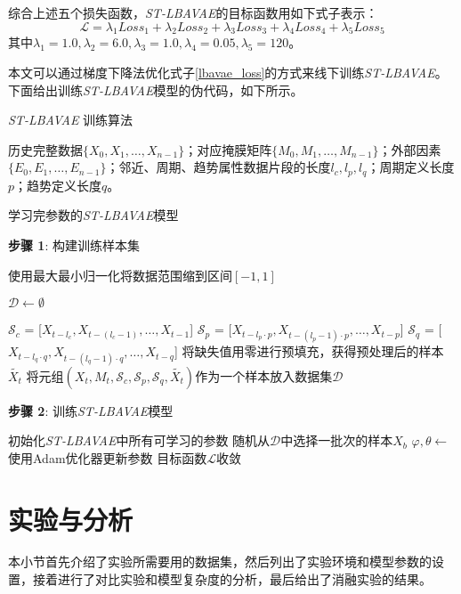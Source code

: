 综合上述五个损失函数，\textit{ST-LBAVAE}的目标函数用如下式子表示：
\begin{equation}
	\mathcal{L} = \lambda_1 Loss_1 + \lambda_2 Loss_2 + \lambda_3 Loss_3 + \lambda_4 Loss_4 + \lambda_5 Loss_5 \label{lbavae_loss}
\end{equation}
其中$\lambda_1=1.0, \lambda_2=6.0, \lambda_3=1.0, \lambda_4=0.05, \lambda_5=120$。
 
本文可以通过梯度下降法优化式子\eqref{lbavae_loss}的方式来线下训练\textit{ST-LBAVAE}。下面给出训练\textit{ST-LBAVAE}模型的伪代码，如下所示。
\begin{algorithm}[htbp]
	\renewcommand{\algorithmicrequire}{\textbf{输入:}}
	\renewcommand{\algorithmicensure}{\textbf{输出:}}
	\caption{\quad \textit{ST-LBAVAE} 训练算法}
	\label{alg1}
	\begin{algorithmic}[1]
		\REQUIRE 历史完整数据$\{X_0, X_1, \dots,X_{n-1}  \}$；对应掩膜矩阵$\{M_0, M_1, \dots,M_{n-1}  \}$；外部因素$\{E_0, E_1, \dots,E_{n-1}  \}$；邻近、周期、趋势属性数据片段的长度$l_c, l_p, l_q$；周期定义长度$p$；趋势定义长度$q$。
		
		\ENSURE 学习完参数的\textit{ST-LBAVAE}模型
		
		\textbf{步骤 1}: 构建训练样本集 
		
		\STATE 使用最大最小归一化将数据范围缩到区间$[-1, 1]$
		
		\STATE $\mathcal{D} \longleftarrow \emptyset$
		
			\STATE $\mathcal{S}_c$ = [$X_{t-l_c}, X_{t-({l_c-1})}, \dots, X_{t-1}$]
			\STATE $\mathcal{S}_p$ = [$X_{t-l_p \cdot p}, X_{t-({l_p-1}) \cdot p}, \dots, X_{t-p}$]
			\STATE $\mathcal{S}_q$ = [$X_{t-l_q \cdot q}, X_{t-({l_q-1}) \cdot q}, \dots, X_{t-q}$]
			\STATE 将缺失值用零进行预填充，获得预处理后的样本$\widetilde{X_{t}}$
			\STATE 将元组$(X_t, M_t, \mathcal{S}_c, \mathcal{S}_p, \mathcal{S}_q, \widetilde{X_{t}})$作为一个样本放入数据集$\mathcal{D}$
		\ENDFOR
		
		\textbf{步骤 2}: 训练\textit{ST-LBAVAE}模型
		 
		\STATE 初始化\textit{ST-LBAVAE}中所有可学习的参数
		\REPEAT
		\STATE 随机从$\mathcal{D}$中选择一批次的样本$X_b$
		\STATE $\varphi, \theta \longleftarrow$ 使用Adam优化器更新参数 
		\UNTIL 目标函数$\mathcal{L}$收敛
	\end{algorithmic}  
\end{algorithm}


\section{实验与分析} \label{sec4_7}
本小节首先介绍了实验所需要用的数据集，然后列出了实验环境和模型参数的设置，接着进行了对比实验和模型复杂度的分析，最后给出了消融实验的结果。
